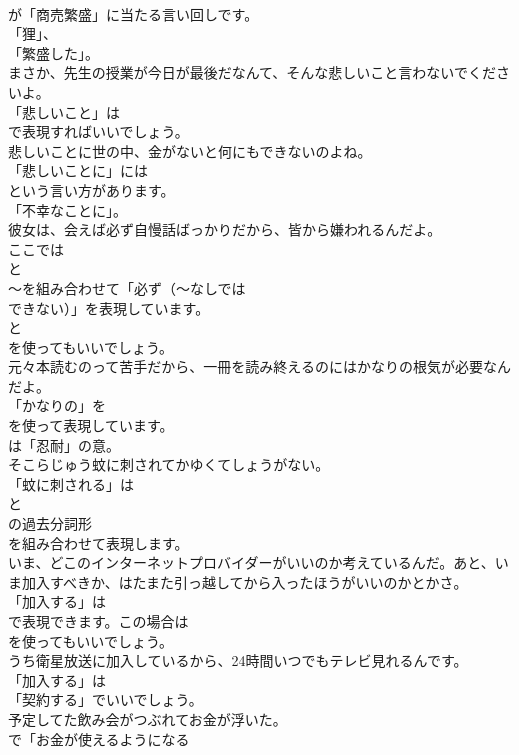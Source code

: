 \documentclass[8pt]{extreport}
\begin{document}
\begin{CJK}{UTF8}{min}
\\	が「商売繁盛」に当たる言い回しです。
\\	「狸」、
\\	「繁盛した」。	
\\	まさか、先生の授業が今日が最後だなんて、そんな悲しいこと言わないでくださいよ。 
\\	「悲しいこと」は
\\	で表現すればいいでしょう。	
\\	悲しいことに世の中、金がないと何にもできないのよね。 
\\	「悲しいことに」には
\\	という言い方があります。
\\	「不幸なことに」。	
\\	彼女は、会えば必ず自慢話ばっかりだから、皆から嫌われるんだよ。 
\\	ここでは 
\\	と 
\\	～を組み合わせて「必ず（～なしでは 
\\	できない）」を表現しています。
\\	と 
\\	を使ってもいいでしょう。	
\\	元々本読むのって苦手だから、一冊を読み終えるのにはかなりの根気が必要なんだよ。 
\\	「かなりの」を
\\	を使って表現しています。
\\	は「忍耐」の意。	
\\	そこらじゅう蚊に刺されてかゆくてしょうがない。 
\\	「蚊に刺される」は
\\	と
\\	の過去分詞形
\\	を組み合わせて表現します。	
\\	いま、どこのインターネットプロバイダーがいいのか考えているんだ。あと、いま加入すべきか、はたまた引っ越してから入ったほうがいいのかとかさ。 
\\	「加入する」は 
\\	で表現できます。この場合は 
\\	を使ってもいいでしょう。	
\\	うち衛星放送に加入しているから、24時間いつでもテレビ見れるんです。 
\\	「加入する」は
\\	「契約する」でいいでしょう。	
\\	予定してた飲み会がつぶれてお金が浮いた。 
\\	で「お金が使えるようになる

\end{CJK}
\end{document}
